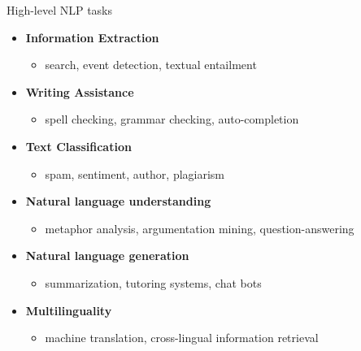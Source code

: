 \begin{frame}{High-level NLP tasks}

\vfill

\begin{itemize}
	\item \textbf{Information Extraction}
	\begin{itemize}
		\item search, event detection, textual entailment
	\end{itemize}
	\item \textbf{Writing Assistance} 
	\begin{itemize}
		\item spell checking, grammar checking, auto-completion
	\end{itemize}
	\item \textbf{Text Classification}
	\begin{itemize}
		\item spam, sentiment, author, plagiarism
	\end{itemize}
	\item \textbf{Natural language understanding} 
	\begin{itemize}
		\item metaphor analysis, argumentation mining, question-answering
	\end{itemize}
	\item \textbf{Natural language generation}
	\begin{itemize}
		\item summarization, tutoring systems, chat bots
	\end{itemize}
	\item \textbf{Multilinguality}
	\begin{itemize}
		\item machine translation, cross-lingual information retrieval
	\end{itemize}
\end{itemize}

\vfill

\end{frame}


